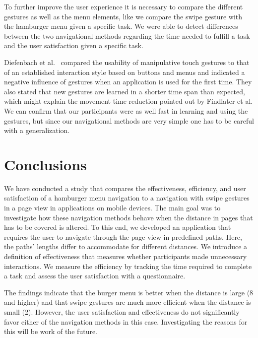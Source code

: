 \documentclass{sig-alternate-05-2015}
\begin{document}
To further improve the user experience it is necessary to compare the different gestures as well as the menu elements, like we compare the swipe gesture with the hamburger menu given a specific task. 
We were able to detect differences between the two navigational methods regarding the time needed to fulfill a task and the user satisfaction given a specific task.

Diefenbach et al.~\cite{heuwing2015usability} compared the usability of manipulative touch gestures to that of an established interaction style based on buttons and menus and indicated a negative influence of gestures when an application is used for the first time. 
They also stated that new gestures are learned in a shorter time span than expected, which might explain the movement time reduction pointed out by Findlater
et al. 
We can confirm that our participants were as well fast in learning and using the gestures, but since our navigational methods are very simple one has to be careful with a generalization.

\section{Conclusions}
We have conducted a study that compares the effectiveness, efficiency, and user satisfaction of a hamburger menu navigation to a navigation with swipe
gestures in a page view in applications on mobile devices. The main goal was to investigate how these navigation methods behave when the distance in pages
that has to be covered is altered. To this end, we developed an application that requires the user to navigate through the page view in predefined
paths. Here, the paths' lengths differ to accommodate for different distances. We introduce a definition of effectiveness that measures whether participants made unnecessary interactions. We measure the efficiency by tracking the time
required to complete a task and assess the user satisfaction with a questionnaire.

The findings indicate that the burger menu is better when the distance is large (8 and higher) and that swipe gestures are much more efficient
when the distance is small (2). However, the user satisfaction and effectiveness do not significantly favor either of the navigation methods in this case.
Investigating the reasons for this will be work of the future.

\end{document}
